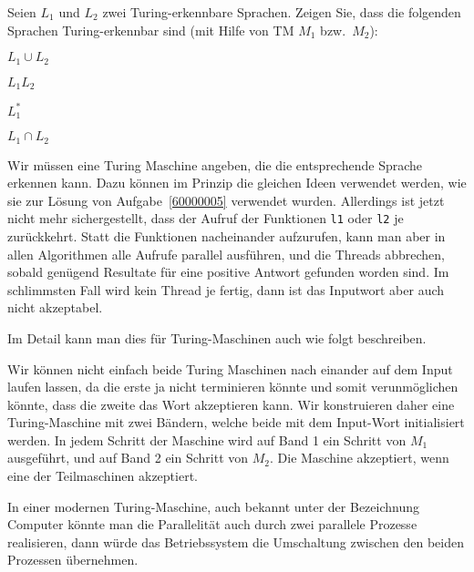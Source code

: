 Seien $L_1$ und $L_2$ zwei Turing-erkennbare Sprachen. Zeigen Sie, dass
die folgenden Sprachen Turing-erkennbar sind (mit Hilfe von TM $M_1$
bzw.~$M_2$):
\begin{teilaufgaben}
\item $L_1\cup L_2$
\item $L_1L_2$
\item $L_1^*$
\item $L_1\cap L_2$
\end{teilaufgaben}


\begin{loesung}
Wir müssen eine Turing Maschine angeben, die die entsprechende
Sprache erkennen kann.
Dazu können im Prinzip die gleichen Ideen verwendet werden, wie sie
zur Lösung von Aufgabe~\ref{60000005} verwendet wurden.
Allerdings ist jetzt nicht mehr sichergestellt, dass der Aufruf
der Funktionen \texttt{l1} oder \texttt{l2} je zurückkehrt.
Statt die Funktionen nacheinander aufzurufen, kann man aber in allen
Algorithmen alle Aufrufe parallel ausführen, und die Threads abbrechen,
sobald genügend Resultate für eine positive Antwort gefunden worden
sind. Im schlimmsten Fall wird kein Thread je fertig, dann ist das
Inputwort aber auch nicht akzeptabel.

Im Detail kann man dies für Turing-Maschinen auch wie folgt
beschreiben.
\begin{teilaufgaben}
\item
Wir können nicht einfach beide Turing Maschinen nach einander
auf dem Input laufen lassen, da die erste ja nicht terminieren könnte und
somit verunmöglichen könnte, dass die zweite das Wort akzeptieren kann.
Wir konstruieren daher eine Turing-Maschine mit zwei Bändern, welche
beide mit dem Input-Wort initialisiert werden.
In jedem Schritt der Maschine wird auf Band 1 ein Schritt von $M_1$
ausgeführt, und auf Band 2 ein Schritt von $M_2$.
Die Maschine akzeptiert, wenn eine der Teilmaschinen
akzeptiert.

In einer modernen Turing-Maschine, auch bekannt unter der Bezeichnung
Computer könnte man die Parallelität auch durch zwei parallele
Prozesse realisieren, dann würde das Betriebssystem die Umschaltung
zwischen den beiden Prozessen übernehmen.


\end{teilaufgaben}
\end{loesung}
